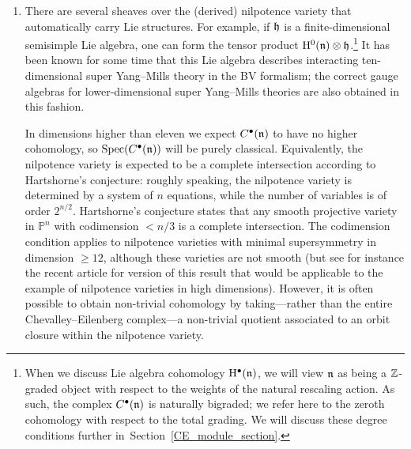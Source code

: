 \documentclass[pdftex]{sigma}
\numberwithin{equation}{section}
\def\bu{\bullet}
\DeclareMathOperator{\Spec}{Spec}
\begin{document}
\begin{enumerate}
	For example, as computed in~\cite{CederwallM5} and discussed in~\cite[Section~7.3]{spinortwist} and~\cite{MaxTwist}, if $\fn$ is the eleven-dimensional $\mathcal N=1$ supertranslation algebra, the eleven-dimensional supergravity multiplet arises from the zeroth cohomology of $C^\bullet(\fn)$, placed in degree $-3$ with respect to the natural weight grading, as a $C^\bullet(\fn)$-module. In order to obtain an \emph{interaction}, it would suffice to define, up to homotopy, a Lie structure on this module. It would be interesting to understand the action functionals of \cite{Ced-11d, Ced-towards} in this language, and to use them to connect to component actions for perturbative supergravity, either twisted or untwisted. An interacting BV theory conjecturally describing the minimal twist of eleven-dimensional supergravity was studied in~\cite{RSW}.
	
	
	\item There are several sheaves over the (derived) nilpotence variety that automatically carry Lie structures. For example, if $\mathfrak h$ is a finite-dimensional semisimple Lie algebra, one can form the tensor product $\mathrm H^0(\mathfrak n) \otimes \mathfrak h$.\footnote{When we discuss Lie algebra cohomology $\mathrm H^\bu(\fn)$, we will view $\fn$ as being a $\mathbb Z$-graded object with respect to the weights of the natural rescaling action. As such, the complex $C^\bullet(\fn)$ is naturally bigraded; we refer here to the zeroth cohomology with respect to the total grading. We will discuss these degree conditions further in~Section~\ref{CE_module_section}.} It has been known for some time that this Lie algebra describes interacting ten-dimensional super Yang--Mills theory in the BV formalism; the correct gauge algebras for lower-dimensional super Yang--Mills theories are also obtained in this fashion.
	
	In dimensions higher than eleven we expect $C^\bullet(\fn)$ to have no higher cohomology, so $\Spec (C^\bullet(\fn))$ will be purely classical. Equivalently, the nilpotence variety is expected to be a complete intersection according to Hartshorne's conjecture: roughly speaking, the nilpotence variety is determined by a system of $n$ equations, while the number of variables is of order $2^{n/2}$. Hartshorne's conjecture states that any smooth projective variety in $\mathbb P^n$ with codimension $<n/3$ is a complete intersection. The codimension condition applies to nilpotence varieties with minimal supersymmetry in dimension $\ge 12$, although these varieties are not smooth (but see for instance the recent article \cite{ErmanSamSnowden} for version of this result that would be applicable to the example of nilpotence varieties in high dimensions). However, it is often possible to obtain non-trivial cohomology by taking---rather than the entire Chevalley--Eilenberg complex---a non-trivial quotient associated to an orbit closure within the nilpotence variety.
	

\end{enumerate}
\end{document}
